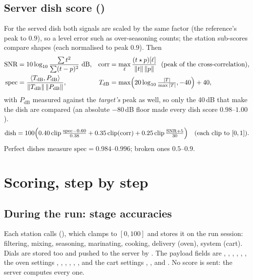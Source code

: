 \documentclass[11pt,a4paper]{article}
\begin{document}
\subsection{Server dish score ()}
For the served dish both signals are scaled by the same factor (the reference's peak to
$0.9$), so a level error such as over-seasoning counts; the station sub-scores compare shapes
(each normalised to peak $0.9$). Then
\begin{align*}
\text{SNR}&=10\log_{10}\frac{\sum t^2}{\sum(t-p)^2}\ \text{dB}, &
\text{corr}&=\max_\ell\frac{(t\star p)[\ell]}{\|t\|\,\|p\|}\ \ (\text{peak of the cross-correlation}),\\
\text{spec}&=\frac{\langle T_{\text{dB}},P_{\text{dB}}\rangle}{\|T_{\text{dB}}\|\,\|P_{\text{dB}}\|}, &
T_{\text{dB}}&=\max\Bigl(20\log_{10}\tfrac{|T|}{\max|T|},-40\Bigr)+40,
\end{align*}
with $P_{\text{dB}}$ measured against the \emph{target's} peak as well, so only the 40\,dB that make
the dish are compared (an absolute $-80$\,dB floor made every dish score $0.98$--$1.00$).
\[
\text{dish}=100\Bigl(0.40\operatorname{clip}\tfrac{\text{spec}-0.60}{0.38}+0.35\operatorname{clip}(\text{corr})
+0.25\operatorname{clip}\tfrac{\text{SNR}+5}{30}\Bigr)\quad(\text{each clip to }[0,1]).
\]
Perfect dishes measure $\text{spec}=0.984$--$0.996$; broken ones $0.5$--$0.9$.

\section{Scoring, step by step}\label{sec:scoring}
\subsection{During the run: stage accuracies}
Each station calls  (), which clamps to $[0,100]$
and stores it on the run session: filtering, mixing, seasoning, marinating, cooking,
delivery (oven), system (cart). Dials are stored too and pushed to the
server by . The payload fields are
, , , , , ,
the oven settings , , , ,
, , and the cart
settings , ,  and
. No score is sent: the server computes every one.
\end{document}
